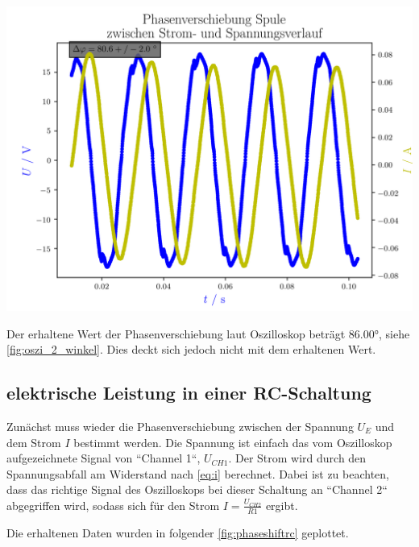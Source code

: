 \documentclass[11pt,ngerman]{scrartcl}
\begin{document}
\begin{center}
	\begin{minipage}[t]{0.8\textwidth}
		\includegraphics[width=\textwidth]{./figures/phaseleistung/Versuch3/phaseshiftind.png}
		\label{fig:phaseshiftind}
	\end{minipage}
\end{center}

Der erhaltene Wert der Phasenverschiebung laut Oszilloskop beträgt 86.00°,
siehe \autoref{fig:oszi_2_winkel}. Dies deckt sich jedoch nicht mit dem
erhaltenen Wert.

\subsection{elektrische Leistung in einer RC-Schaltung}

Zunächst muss wieder die Phasenverschiebung zwischen der Spannung $U_E$ und dem Strom $I$ bestimmt werden.
Die Spannung ist einfach das vom Oszilloskop aufgezeichnete Signal von ``Channel 1``, $U_{CH1}$.
Der Strom wird durch den Spannungsabfall am Widerstand nach \autoref{eq:i} berechnet. Dabei ist zu beachten, dass das richtige Signal des Oszilloskops bei dieser Schaltung an ``Channel 2`` abgegriffen wird, sodass sich für den Strom  $I = \frac{U_{CH2}}{R1}$ ergibt.

\vspace{2mm}

Die erhaltenen Daten wurden in folgender \autoref{fig:phaseshiftrc} geplottet.
\end{document}
